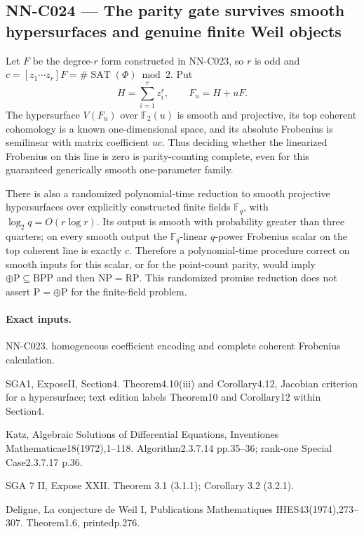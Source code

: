 \subsection{NN-C024 --- The parity gate survives smooth hypersurfaces and genuine finite Weil objects}
\begin{proposition}[NN-C024]
Let $F$ be the degree-$r$ form constructed in NN-C023, so $r$ is odd and $c=[z_1\cdots z_r]F=\#\operatorname{SAT}(\Phi)\bmod2$. Put
\[
 H=\sum_{i=1}^r z_i^r,\qquad F_u=H+uF.
\]
The hypersurface $V(F_u)$ over $\mathbb F_2(u)$ is smooth and projective, its top coherent cohomology is a known one-dimensional space, and its absolute Frobenius is semilinear with matrix coefficient $uc$. Thus deciding whether the linearized Frobenius on this line is zero is parity-counting complete, even for this guaranteed generically smooth one-parameter family.

There is also a randomized polynomial-time reduction to smooth projective hypersurfaces over explicitly constructed finite fields $\mathbb F_q$, with $\log_2q=O(r\log r)$. Its output is smooth with probability greater than three quarters; on every smooth output the $\mathbb F_q$-linear $q$-power Frobenius scalar on the top coherent line is exactly $c$. Therefore a polynomial-time procedure correct on smooth inputs for this scalar, or for the point-count parity, would imply $\oplus\mathrm P\subseteq\mathrm{BPP}$ and then $\mathrm{NP}=\mathrm{RP}$. This randomized promise reduction does not assert $\mathrm P=\oplus\mathrm P$ for the finite-field problem.
\end{proposition}
\paragraph{Exact inputs.}
NN-C023. homogeneous coefficient encoding and complete coherent Frobenius calculation.

SGA1, ExposeII, Section4. Theorem4.10(iii) and Corollary4.12, Jacobian criterion for a hypersurface; text edition labels Theorem10 and Corollary12 within Section4.

Katz, Algebraic Solutions of Differential Equations, Inventiones Mathematicae18(1972),1--118. Algorithm2.3.7.14 pp.35--36; rank-one Special Case2.3.7.17 p.36.

SGA 7 II, Expose XXII. Theorem 3.1 (3.1.1); Corollary 3.2 (3.2.1).

Deligne, La conjecture de Weil I, Publications Mathematiques IHES43(1974),273--307. Theorem1.6, printedp.276.

